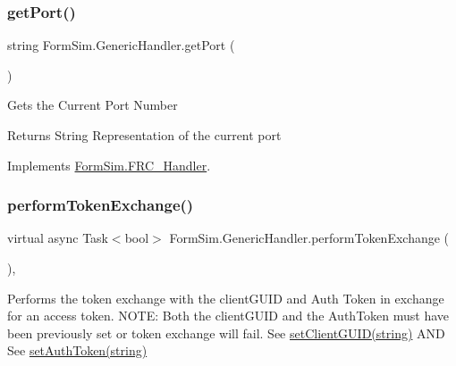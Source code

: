 \subsubsection{\texorpdfstring{get\+Port()}{getPort()}}
{\footnotesize\ttfamily string Form\+Sim.\+Generic\+Handler.\+get\+Port (\begin{DoxyParamCaption}{ }\end{DoxyParamCaption})\hspace{0.3cm}{\ttfamily [inline]}}



Gets the Current Port Number 

\begin{DoxyReturn}{Returns}
String Representation of the current port
\end{DoxyReturn}


Implements \mbox{\hyperlink{interface_form_sim_1_1_f_r_c___handler_add0725551d06bb4cfb33c23bef426814}{Form\+Sim.\+F\+R\+C\+\_\+\+Handler}}.

\mbox{\label{class_form_sim_1_1_generic_handler_a731bd7dada7e2d13fd9c9d768bd387ee}} 
\subsubsection{\texorpdfstring{perform\+Token\+Exchange()}{performTokenExchange()}}
{\footnotesize\ttfamily virtual async Task$<$bool$>$ Form\+Sim.\+Generic\+Handler.\+perform\+Token\+Exchange (\begin{DoxyParamCaption}{ }\end{DoxyParamCaption})\hspace{0.3cm}{\ttfamily [inline]}, {\ttfamily [virtual]}}



Performs the token exchange with the client\+G\+U\+ID and Auth Token in exchange for an access token. N\+O\+TE\+: Both the client\+G\+U\+ID and the Auth\+Token must have been previously set or token exchange will fail. See \mbox{\hyperlink{class_form_sim_1_1_generic_handler_a3c934d9ba3f0efaadac331502ce0189c}{set\+Client\+G\+U\+I\+D(string)}} A\+ND See \mbox{\hyperlink{class_form_sim_1_1_generic_handler_a905d080f02134e993d7afbb1dcc8f44b}{set\+Auth\+Token(string)}} 

